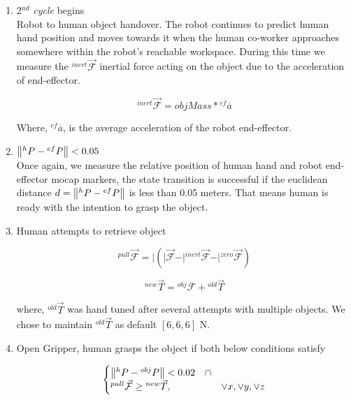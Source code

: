 \begin{enumerate}[start=0,label={\bf{t}\arabic*:}]
    \item 2$^{nd}$ \textit{cycle} begins\\
    Robot to human object handover. The robot continues to predict human hand position and moves towards it when the human co-worker approaches somewhere within the robot's reachable workspace. During this time we measure the ${}^{inert}\vec{\mathcal{F}}$ inertial force acting on the object due to the acceleration of end-effector.

    \begin{equation}
        {}^{inert}\vec{\mathcal{F}}  = objMass * {}^{ef}\overline{a}
    \end{equation}

    Where, ${}^{ef}\overline{a}$, is the average acceleration of the robot end-effector.

    \item $\norm{{}^h{P} - {}^{ef}{P}} < 0.05$\\
    Once again, we measure the relative position of human hand and robot end-effector mocap markers, the state transition is successful if the euclidean distance $d = \norm{{}^h{P} - {}^{ef}{P}}$ is less than 0.05 meters. That means human is ready with the intention to grasp the object.
    
    \item Human attempts to retrieve object
    
    \begin{equation}
    {}^{pull}\vec{\mathcal{F}} = \vert{ (\vert{\vec{\mathcal{F}}} - \vert{{}^{inert}\vec{\mathcal{F}}} - \vert{{}^{zero}\vec{\mathcal{F}}}) }
    \end{equation}
    
    \begin{equation}
    {}^{new}\vec{T} = {}^{obj}\overline{\mathcal{F}} + {}^{old}\vec{T}
    \end{equation}
    
    where, ${}^{old}\vec{T}$ was hand tuned after several attempts with multiple objects. We chose to maintain ${}^{old}\vec{T}$ as default $[6, 6, 6]$ N. 
    
    \item Open Gripper, human grasps the object if both below conditions satisfy

    \begin{equation}\label{Fpull}
    \begin{cases}
     \norm{{}^h{P} - {}^{obj}{P}} < 0.02 \quad \cap  \\
     {}^{pull}\vec{\mathcal{F}}\geq {}^{new}\vec{T}, & \lor x, \lor y, \lor z
   \end{cases}
   \end{equation}


\end{enumerate}
